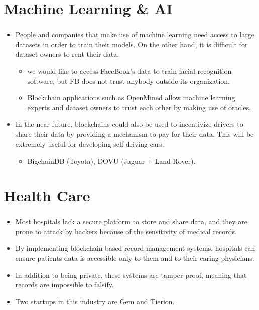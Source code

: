 \documentclass[ 10pt, xcolor = dvipsnames]{beamer}
\begin{document}
\section{Machine Learning \& AI}
\begin{frame}[allowframebreaks]
\frametitle{\insertsection}

\begin{itemize}
\item People and companies that make use of machine learning need access to large datasets in order to train their models. On the other hand, it is \linebreak difficult for dataset owners to rent their data. 
\begin{itemize}
\item \Eg we would like to access FaceBook's data to train facial recognition software, but FB does not trust anybody outside its organization. 
\item Blockchain applications such as OpenMined allow machine learning experts and dataset owners to trust each other by making use of oracles. 
\end{itemize}
\item In the near future, blockchains could also be used to incentivize drivers to share their data by providing a mechanism to pay for their data. This will be extremely useful for developing self-driving cars. 
\begin{itemize}
\item \Eg BigchainDB (Toyota), DOVU (Jaguar + Land Rover). 
\end{itemize}
\end{itemize}

\end{frame}

\section{Health Care}
\begin{frame}[allowframebreaks]
\frametitle{\insertsection}

\begin{itemize}
\item Most hospitals lack a secure platform to store and share data, and they are prone to attack by hackers because of the sensitivity of medical records. 
\item By implementing blockchain-based record management systems, hospitals can ensure patients data is accessible only to them and to their caring physicians.
\item In addition to being private, these systems are tamper-proof, meaning that records are impossible to falsify.
\item Two startups in this industry are Gem and Tierion. 

\end{itemize}

\end{frame}
\end{document}
